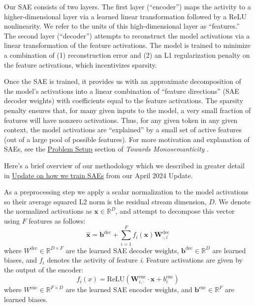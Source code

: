 \documentclass{article}
\begin{document}
Our SAE consists of two layers. The first layer (“encoder”) maps the activity to a higher-dimensional layer via a learned linear transformation followed by a ReLU nonlinearity. We refer to the units of this high-dimensional layer as “features.” The second layer (“decoder”) attempts to reconstruct the model activations via a linear transformation of the feature activations. The model is trained to minimize a combination of (1) reconstruction error and (2) an L1 regularization penalty on the feature activations, which incentivizes sparsity.

Once the SAE is trained, it provides us with an approximate decomposition of the model’s activations into a linear combination of “feature directions” (SAE decoder weights) with coefficients equal to the feature activations. The sparsity penalty ensures that, for many given inputs to the model, a very small fraction of features will have nonzero activations. Thus, for any given token in any given context, the model activations are “explained” by a small set of active features (out of a large pool of possible features). For more motivation and explanation of SAEs, see the \href{https://transformer-circuits.pub/2023/monosemantic-features/index.html\#problem-setup}{Problem Setup} section of \textit{Towards Monosemanticity }\cite{bricken2023monosemanticity}.

Here’s a brief overview of our methodology which we described in greater detail in \href{https://transformer-circuits.pub/2024/april-update/index.html\#training-saes}{Update on how we train SAEs} from our April 2024 Update.

As a preprocessing step we apply a scalar normalization to the model activations so their average squared L2 norm is the residual stream dimension, $D$. We denote the normalized activations as $\mathbf{x} \in \mathbb{R}^D$, and attempt to decompose this vector using $F$ features as follows:
$$\hat{\mathbf{x}} = \mathbf{b}^\text{dec} + \sum_{i=1}^F f_i(\mathbf{x}) \mathbf{W}^\text{dec}_{\cdot,i}$$
where $W^\text{dec} \in \mathbb{R}^{D \times F}$ are the learned SAE decoder weights, $\mathbf{b}^\text{dec} \in \mathbb{R}^D$ are learned biases, and $f_i$ denotes the activity of feature \textit{i}. Feature activations are given by the output of the encoder:
$$f_i(x) = \text{ReLU}\left(\mathbf{W}^\text{enc}_{i, \cdot} \cdot \mathbf{x} +b^\text{enc}_i \right)$$
where $W^\text{enc} \in \mathbb{R}^{F \times D}$ are the learned SAE encoder weights, and $\mathbf{b}^\text{enc} \in \mathbb{R}^F$ are learned biases.
\end{document}
